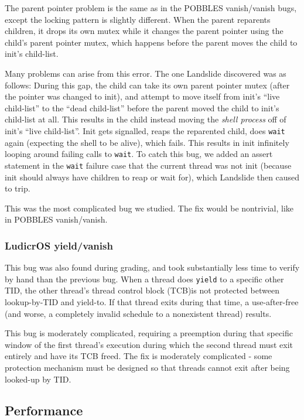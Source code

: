 The parent pointer problem is the same as in the POBBLES vanish/vanish bugs, except the locking pattern is slightly different. When the parent reparents children, it drops its own mutex while it changes the parent pointer using the child's parent pointer mutex, which happens before the parent moves the child to init's child-list.

Many problems can arise from this error. The one Landslide discovered was as follows: During this gap, the child can take its own parent pointer mutex (after the pointer was changed to init), and attempt to move itself from init's ``live child-list'' to the ``dead child-list'' before the parent moved the child to init's child-list at all. This results in the child instead moving the {\em shell process} off of init's ``live child-list''. Init gets signalled, reaps the reparented child, does \texttt{wait} again (expecting the shell to be alive), which fails. This results in init infinitely looping around failing calls to \texttt{wait}. To catch this bug, we added an assert statement in the \texttt{wait} failure case that the current thread was not init (because init should always have children to reap or wait for), which Landslide then caused to trip.

This was the most complicated bug we studied. The fix would be nontrivial, like in POBBLES vanish/vanish.

\subsubsection{LudicrOS yield/vanish}

This bug was also found during grading, and took substantially less time to verify by hand than the previous bug. When a thread does \texttt{yield} to a specific other TID, the other thread's thread control block (TCB)is not protected between lookup-by-TID and yield-to. If that thread exits during that time, a use-after-free (and worse, a completely invalid schedule to a nonexistent thread) results.

This bug is moderately complicated, requiring a preemption during that specific window of the first thread's execution during which the second thread must exit entirely and have its TCB freed. The fix is moderately complicated - some protection mechanism must be designed so that threads cannot exit after being looked-up by TID.

\subsection{Performance}
\label{sec:eval-numbers}

